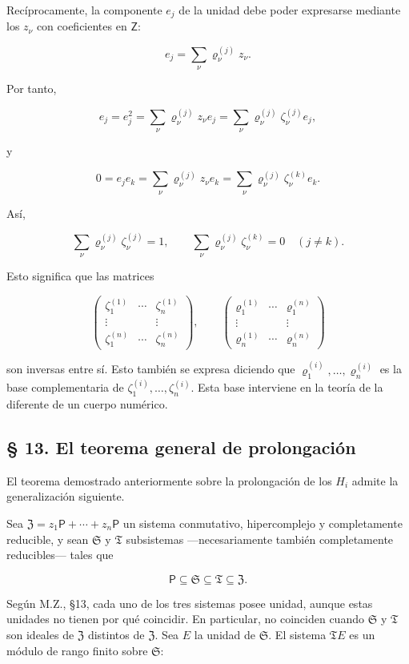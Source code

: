 Recíprocamente, la componente $e_j$ de la unidad debe poder expresarse mediante los $z_\nu$ con coeficientes en $\mathsf Z$:

\[
e_j=\sum_\nu\varrho_\nu^{(j)}z_\nu.
\]

Por tanto,

\[
e_j=e_j^2=\sum_\nu\varrho_\nu^{(j)}z_\nu e_j
=\sum_\nu\varrho_\nu^{(j)}\zeta_\nu^{(j)}e_j,
\]

y

\[
0=e_je_k=\sum_\nu\varrho_\nu^{(j)}z_\nu e_k
=\sum_\nu\varrho_\nu^{(j)}\zeta_\nu^{(k)}e_k.
\]

Así,

\[
\sum_\nu\varrho_\nu^{(j)}\zeta_\nu^{(j)}=1,
\qquad
\sum_\nu\varrho_\nu^{(j)}\zeta_\nu^{(k)}=0\quad(j\ne k).
\]

Esto significa que las matrices

\[
\begin{pmatrix}
\zeta_1^{(1)}&\cdots&\zeta_n^{(1)}\\
\vdots&&\vdots\\
\zeta_1^{(n)}&\cdots&\zeta_n^{(n)}
\end{pmatrix},
\qquad
\begin{pmatrix}
\varrho_1^{(1)}&\cdots&\varrho_1^{(n)}\\
\vdots&&\vdots\\
\varrho_n^{(1)}&\cdots&\varrho_n^{(n)}
\end{pmatrix}
\]

son inversas entre sí. Esto también se expresa diciendo que $\varrho_1^{(i)},\ldots,\varrho_n^{(i)}$ es la base complementaria de $\zeta_1^{(i)},\ldots,\zeta_n^{(i)}$. Esta base interviene en la teoría de la diferente de un cuerpo numérico.

\subsection*{§ 13. El teorema general de prolongación}

El teorema demostrado anteriormente sobre la prolongación de los $H_i$ admite la generalización siguiente.

Sea $\mathfrak Z=z_1\mathsf P+\cdots+z_n\mathsf P$ un sistema conmutativo, hipercomplejo y completamente reducible, y sean $\mathfrak S$ y $\mathfrak T$ subsistemas ---necesariamente también completamente reducibles--- tales que

\[
\mathsf P\subseteq\mathfrak S\subseteq\mathfrak T\subseteq\mathfrak Z.
\]

Según M.Z., §13, cada uno de los tres sistemas posee unidad, aunque estas unidades no tienen por qué coincidir. En particular, no coinciden cuando $\mathfrak S$ y $\mathfrak T$ son ideales de $\mathfrak Z$ distintos de $\mathfrak Z$. Sea $E$ la unidad de $\mathfrak S$. El sistema $\mathfrak T E$ es un módulo de rango finito sobre $\mathfrak S$:

